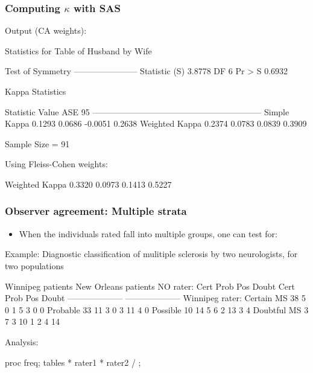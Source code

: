 \begin{frame}[fragile]
  \frametitle{Computing $\kappa$ with SAS}
Output (CA weights):
\begin{Output}[baselinestretch=0.8,gobble=3]
              Statistics for Table of Husband by Wife

                         Test of Symmetry
                      -----------------------
                      Statistic (S)    3.8778
                      DF                    6
                      Pr > S           0.6932

                          Kappa Statistics
 
    Statistic          Value       ASE     95%
    ------------------------------------------------------------
    Simple Kappa      0.1293    0.0686      -0.0051       0.2638
    Weighted Kappa    0.2374    0.0783       0.0839       0.3909

                          Sample Size = 91
\end{Output}
Using Fleiss-Cohen weights:
\begin{Output}[gobble=3]
    Weighted Kappa    0.3320    0.0973       0.1413       0.5227
\end{Output}
\end{frame}

\begin{frame}[fragile]
  \frametitle{Observer agreement: Multiple strata}
  \begin{itemize}
	\item When the individuals rated fall into multiple groups, one can test for:
  \end{itemize}
Example: Diagnostic classification of mulitiple sclerosis by two neurologists,
for two populations \citep{LandisKoch:77}
\begin{listing}[baselinestretch=0.8]
                 Winnipeg patients        New Orleans patients
  NO rater:
                Cert Prob  Pos Doubt      Cert Prob  Pos Doubt 
                --------------------      --------------------
Winnipeg rater:
 Certain MS      38    5    0    1          5    3    0    0
 Probable        33   11    3    0          3   11    4    0
 Possible        10   14    5    6          2   13    3    4
 Doubtful MS      3    7    3   10          1    2    4   14 
\end{listing}
Analysis:
\begin{Input}[numbers=none]
 proc freq;
   tables  * rater1 * rater2 / ;
\end{Input}

\end{frame}

